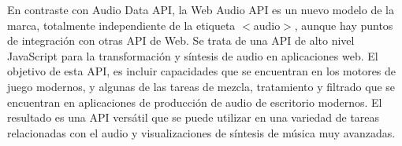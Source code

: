 En contraste con Audio Data API, la Web Audio API es un nuevo modelo de la marca, totalmente independiente de la etiqueta $<$audio$>$,  aunque hay puntos de integración con otras API de Web. Se trata de una API de alto nivel JavaScript para la transformación y síntesis de audio en aplicaciones web. El objetivo de esta API,  es incluir capacidades que se encuentran en los motores de juego modernos,  y algunas de las tareas de mezcla, tratamiento y filtrado que se encuentran en aplicaciones de producción de audio de escritorio modernos. El resultado es una API versátil que se puede utilizar en una variedad de tareas relacionadas con el audio y visualizaciones de síntesis de música muy avanzadas.